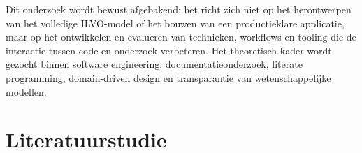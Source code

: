 Dit onderzoek wordt bewust afgebakend: het richt zich niet op het herontwerpen van het volledige ILVO-model of het bouwen van een productieklare applicatie, maar op het ontwikkelen en evalueren van technieken, workflows en tooling die de interactie tussen code en onderzoek verbeteren. Het theoretisch kader wordt gezocht binnen software engineering, documentatieonderzoek, literate programming, domain-driven design en transparantie van wetenschappelijke modellen.



\section{Literatuurstudie}%
\label{sec:literatuurstudie}






